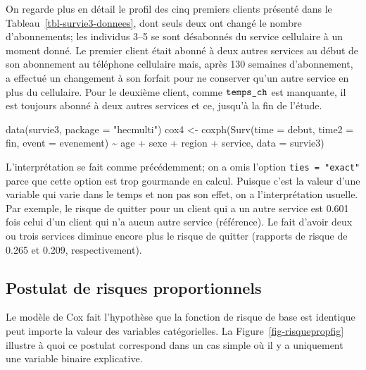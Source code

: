\documentclass[
  11pt,
  letterpaper,
]{scrbook}
\newenvironment{Shaded}{\begin{snugshade}}{\end{snugshade}}
\newcommand{\AttributeTok}[1]{\textcolor[rgb]{0.40,0.45,0.13}{#1}}
\newcommand{\FunctionTok}[1]{\textcolor[rgb]{0.28,0.35,0.67}{#1}}
\newcommand{\NormalTok}[1]{\textcolor[rgb]{0.00,0.23,0.31}{#1}}
\newcommand{\OtherTok}[1]{\textcolor[rgb]{0.00,0.23,0.31}{#1}}
\newcommand{\SpecialCharTok}[1]{\textcolor[rgb]{0.37,0.37,0.37}{#1}}
\newcommand{\StringTok}[1]{\textcolor[rgb]{0.13,0.47,0.30}{#1}}
\theoremstyle{definition}
\theoremstyle{remark}
\begin{document}
On regarde plus en détail le profil des cinq premiers clients présenté
dans le Tableau~\ref{tbl-survie3-donnees}, dont seuls deux ont changé le
nombre d'abonnements; les individus 3--5 se sont désabonnés du service
cellulaire à un moment donné. Le premier client était abonné à deux
autres services au début de son abonnement au téléphone cellulaire mais,
après 130 semaines d'abonnement, a effectué un changement à son forfait
pour ne conserver qu'un autre service en plus du cellulaire. Pour le
deuxième client, comme \(\verb+temps_ch+\) est manquante, il est
toujours abonné à deux autres services et ce, jusqu'à la fin de l'étude.

\begin{Shaded}
\begin{Highlighting}[]
\FunctionTok{data}\NormalTok{(survie3, }\AttributeTok{package =} \StringTok{"hecmulti"}\NormalTok{)}
\NormalTok{cox4 }\OtherTok{\textless{}{-}} \FunctionTok{coxph}\NormalTok{(}\FunctionTok{Surv}\NormalTok{(}\AttributeTok{time =}\NormalTok{ debut, }
                   \AttributeTok{time2 =}\NormalTok{ fin, }
                   \AttributeTok{event =}\NormalTok{ evenement) }\SpecialCharTok{\textasciitilde{}} 
\NormalTok{                age }\SpecialCharTok{+}\NormalTok{ sexe }\SpecialCharTok{+}\NormalTok{ region }\SpecialCharTok{+}\NormalTok{ service, }
              \AttributeTok{data =}\NormalTok{ survie3)}
\end{Highlighting}
\end{Shaded}

L'interprétation se fait comme précédemment; on a omis l'option
\texttt{ties\ =\ "exact"} parce que cette option est trop gourmande en
calcul. Puisque c'est la valeur d'une variable qui varie dans le temps
et non pas son effet, on a l'interprétation usuelle. Par exemple, le
risque de quitter pour un client qui a un autre service est 0.601 fois
celui d'un client qui n'a aucun autre service (référence). Le fait
d'avoir deux ou trois services diminue encore plus le risque de quitter
(rapports de risque de 0.265 et 0.209, respectivement).

\hypertarget{postulat-de-risques-proportionnels}{%
\subsection{Postulat de risques
proportionnels}\label{postulat-de-risques-proportionnels}}

Le modèle de Cox fait l'hypothèse que la fonction de risque de base est
identique peut importe la valeur des variables catégorielles. La
Figure~\ref{fig-risquepropfig} illustre à quoi ce postulat correspond
dans un cas simple où il y a uniquement une variable binaire
explicative.
\end{document}
